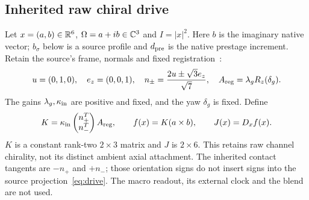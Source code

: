 \subsection{Inherited raw chiral drive}\label{sec:drive}
Let $x=(a,b)\in\mathbb R^6$, $\Omega=a+ib\in\mathbb C^3$ and $I=|x|^2$. Here $b$ is the imaginary native vector; $b_\sigma$ below is a source profile and $d_{\rm pre}$ is the native prestage increment. Retain the source's frame, normals and fixed registration~\cite[foundations]{paired}:
\begin{equation}\label{eq:registration}
 u=(0,1,0),\quad e_z=(0,0,1),\quad
 n_\pm=\frac{2u\pm\sqrt3e_z}{\sqrt7},\quad
 A_{\rm reg}=\lambda_gR_z(\delta_g).
\end{equation}
The gains $\lambda_g,\kappa_{\rm in}$ are positive and fixed, and the yaw $\delta_g$ is fixed. Define
\begin{equation}\label{eq:drive}
 K=\kappa_{\rm in}\begin{pmatrix}n_+^T\\n_-^T\end{pmatrix}A_{\rm reg},
 \qquad f(x)=K(a\times b),\qquad J(x)=D_xf(x).
\end{equation}
$K$ is a constant rank-two $2\times3$ matrix and $J$ is $2\times6$.
This retains raw channel chirality, not its distinct ambient axial attachment. The inherited contact tangents are $-n_+$ and $+n_-$; those orientation signs do not insert signs into the source projection~\eqref{eq:drive}. The macro readout, its external clock and the blend are not used.

